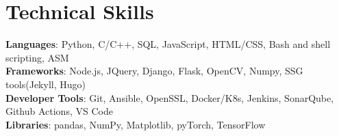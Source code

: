 \documentclass[letterpaper,11pt]{article}
\begin{document}
\section{Technical Skills}
 \begin{itemize}[leftmargin=0.15in, label={}]
    \small{\item{
     \textbf{Languages}{: Python, C/C++, SQL, JavaScript, HTML/CSS, Bash and shell scripting, ASM} \\
     \textbf{Frameworks}{: Node.js, JQuery, Django, Flask, OpenCV, Numpy, SSG tools(Jekyll, Hugo)} \\
     \textbf{Developer Tools}{: Git, Ansible, OpenSSL, Docker/K8s, Jenkins, SonarQube, Github Actions, VS Code} \\
      \textbf{Libraries}{: pandas, NumPy, Matplotlib, pyTorch, TensorFlow}
    }}
 \end{itemize}


\end{document}
